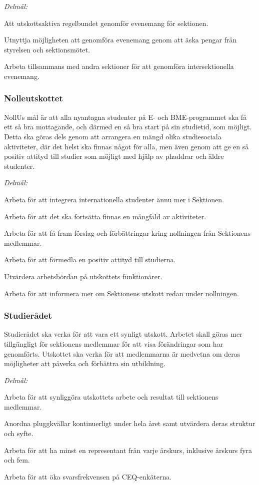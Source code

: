 \documentclass[10pt]{article}
\begin{document}
\emph{Delmål:}
\begin{dashlist}
    \item Att utskottsaktiva regelbundet genomför evenemang för sektionen.
    \item Utnyttja möjligheten att genomföra evenemang genom att äska pengar från styrelsen och sektionsmötet.
    \item Arbeta tillsammans med andra sektioner för att genomföra intersektionella evenemang.
\end{dashlist}

\newpage

\subsubsection*{Nolleutskottet}
NollUs mål är att alla nyantagna studenter på E- och BME-programmet ska få ett så bra mottagande, och därmed en så bra start på sin studietid, som möjligt. Detta ska göras dels genom att arrangera en mängd olika studiesociala aktiviteter, där det helst ska finnas något för alla, men även genom att ge en så positiv attityd till studier som möjligt med hjälp av phaddrar och äldre studenter.

\emph{Delmål:}
\begin{dashlist}
    \item Arbeta för att integrera internationella studenter ännu mer i Sektionen.
    \item Arbeta för att det ska fortsätta finnas en mångfald av aktiviteter.
    \item Arbeta för att få fram förslag och förbättringar kring nollningen från Sektionens medlemmar.
    \item Arbeta för att förmedla en positiv attityd till studierna.
    \item Utvärdera arbetsbördan på utskottets funktionärer.
    \item Arbeta för att informera mer om Sektionens utskott redan under nollningen.
\end{dashlist}

\subsubsection*{Studierådet}
Studierådet ska verka för att vara ett synligt utskott. Arbetet skall göras mer tillgängligt för sektionens medlemmar för att visa förändringar som har genomförts. Utskottet ska verka för att medlemmarna är medvetna om deras möjligheter att påverka och förbättra sin utbildning.

\emph{Delmål:}
\begin{dashlist}
    \item Arbeta för att synliggöra utskottets arbete och resultat till sektionens medlemmar.
    \item Anordna pluggkvällar kontinuerligt under hela året samt utvärdera deras struktur och syfte.
    \item Arbeta för att ha minst en representant från varje årskurs, inklusive årskurs fyra och fem.
    \item Arbeta för att öka svarsfrekvensen på CEQ-enkäterna.
\end{dashlist}

\newpage
\end{document}
